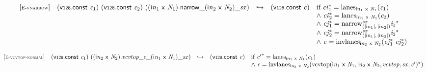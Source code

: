 \vspace{1ex}

$$
\begin{array}{@{}l@{}lcl@{}l@{}}
{[\textsc{\scriptsize E{-}vnarrow}]} \quad & (\mathsf{v{\scriptstyle128}}.\mathsf{const}~{\mathit{c}}_{{1}})~(\mathsf{v{\scriptstyle128}}.\mathsf{const}~{\mathit{c}}_{{2}})~({{{{({{\mathsf{i}}{{\mathit{n}}}}_{{1}}~\mathsf{x}~{\mathit{N}}_{{1}}).\mathsf{narrow}}{\mathsf{\_}}}{({{\mathsf{i}}{{\mathit{n}}}}_{{2}}~\mathsf{x}~{\mathit{N}}_{{2}})}}{\mathsf{\_}}}{{\mathit{sx}}}) &\hookrightarrow& (\mathsf{v{\scriptstyle128}}.\mathsf{const}~{\mathit{c}}) &\quad
  \mbox{if}~{{\mathit{ci}}_{{1}}^\ast} = {{\mathrm{lanes}}}_{{{\mathsf{i}}{{\mathit{n}}}}_{{1}}~\mathsf{x}~{\mathit{N}}_{{1}}}({\mathit{c}}_{{1}}) \\
 &&&&\quad {\land}~{{\mathit{ci}}_{{2}}^\ast} = {{\mathrm{lanes}}}_{{{\mathsf{i}}{{\mathit{n}}}}_{{1}}~\mathsf{x}~{\mathit{N}}_{{1}}}({\mathit{c}}_{{2}}) \\
 &&&&\quad {\land}~{{\mathit{cj}}_{{1}}^\ast} = {{{{{\mathrm{narrow}}}_{({|{{\mathsf{i}}{{\mathit{n}}}}_{{1}}|},\, {|{{\mathsf{i}}{{\mathit{n}}}}_{{2}}|})}^{{\mathit{sx}}}}}{{\mathit{i}}_{{1}}}^\ast} \\
 &&&&\quad {\land}~{{\mathit{cj}}_{{2}}^\ast} = {{{{{\mathrm{narrow}}}_{({|{{\mathsf{i}}{{\mathit{n}}}}_{{1}}|},\, {|{{\mathsf{i}}{{\mathit{n}}}}_{{2}}|})}^{{\mathit{sx}}}}}{{\mathit{i}}_{{2}}}^\ast} \\
 &&&&\quad {\land}~{\mathit{c}} = {{\mathrm{invlanes}}}_{{{\mathsf{i}}{{\mathit{n}}}}_{{2}}~\mathsf{x}~{\mathit{N}}_{{2}}}({{\mathit{cj}}_{{1}}^\ast}~{{\mathit{cj}}_{{2}}^\ast}) \\
\end{array}
$$

\vspace{1ex}

$$
\begin{array}{@{}l@{}lcl@{}l@{}}
{[\textsc{\scriptsize E{-}vcvtop{-}normal}]} \quad & (\mathsf{v{\scriptstyle128}}.\mathsf{const}~{\mathit{c}}_{{1}})~(({{\mathsf{i}}{{\mathit{n}}}}_{{2}}~\mathsf{x}~{\mathit{N}}_{{2}}) . {{{{{{{\mathit{vcvtop}}}{\mathsf{\_}}}{\epsilon}}{\mathsf{\_}}}{({{\mathsf{i}}{{\mathit{n}}}}_{{1}}~\mathsf{x}~{\mathit{N}}_{{1}})}}{\mathsf{\_}}}{{\mathit{sx}}}) &\hookrightarrow& (\mathsf{v{\scriptstyle128}}.\mathsf{const}~{\mathit{c}}) &\quad
  \mbox{if}~{{\mathit{c}'}^\ast} = {{\mathrm{lanes}}}_{{{\mathsf{i}}{{\mathit{n}}}}_{{1}}~\mathsf{x}~{\mathit{N}}_{{1}}}({\mathit{c}}_{{1}}) \\
 &&&&\quad {\land}~{\mathit{c}} = {{\mathrm{invlanes}}}_{{{\mathsf{i}}{{\mathit{n}}}}_{{2}}~\mathsf{x}~{\mathit{N}}_{{2}}}({{\mathrm{vcvtop}}({{\mathsf{i}}{{\mathit{n}}}}_{{1}}~\mathsf{x}~{\mathit{N}}_{{1}}, {{\mathsf{i}}{{\mathit{n}}}}_{{2}}~\mathsf{x}~{\mathit{N}}_{{2}}, {\mathit{vcvtop}}, {\mathit{sx}}, {\mathit{c}'})^\ast}) \\
\end{array}
$$

